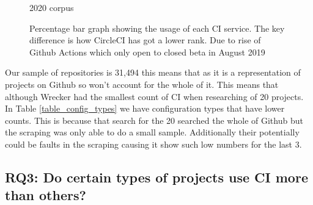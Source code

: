 \documentclass[twoside,12pt,titlepage,a4paper]{article}
\begin{document}
\begin{figure}[!htbp]
\begin{minipage}{.48\textwidth}
  \caption[]{2020 corpus}
  \label{graph:config_bar2020}
  \end{minipage}
  \caption[]{Percentage bar graph showing the usage of each CI service. The key difference is how CircleCI has got a lower rank. Due to rise of Github Actions which only open to closed beta in August 2019}
  \label{graph:config_bars}

\end{figure}





Our sample of repositories is 31,494 this means that as it is a representation of projects on Github so won't account for the whole of it. This means that although Wrecker had the smallest count of CI when researching of 20 projects. In Table \ref{table_config_types} we have configuration types that have lower counts. This is because that search for the 20 searched the whole of Github but the scraping was only able to do a small sample. Additionally their potentially could be faults in the scraping causing it show such low numbers for the last 3. 

\vspace*{-0.05in}
\subsection{\textbf{RQ3}: Do certain types of projects use CI more than others?}  
\label{section:RQ3}
\vspace*{-0.05in}
\end{document}
